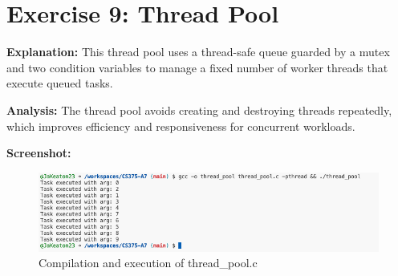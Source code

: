 \documentclass[a4paper,12pt]{article}
\begin{document}
\section{Exercise 9: Thread Pool}


\textbf{Explanation:}  
This thread pool uses a thread-safe queue guarded by a mutex and two condition variables to manage a fixed number of worker threads that execute queued tasks.

\textbf{Analysis:}  
The thread pool avoids creating and destroying threads repeatedly, which improves efficiency and responsiveness for concurrent workloads.

\textbf{Screenshot:}  
\begin{figure}[h]
\centering
\includegraphics[width=\textwidth]{thread_pool_output.png}
\caption{Compilation and execution of thread\_pool.c}
\end{figure}
\end{document}
